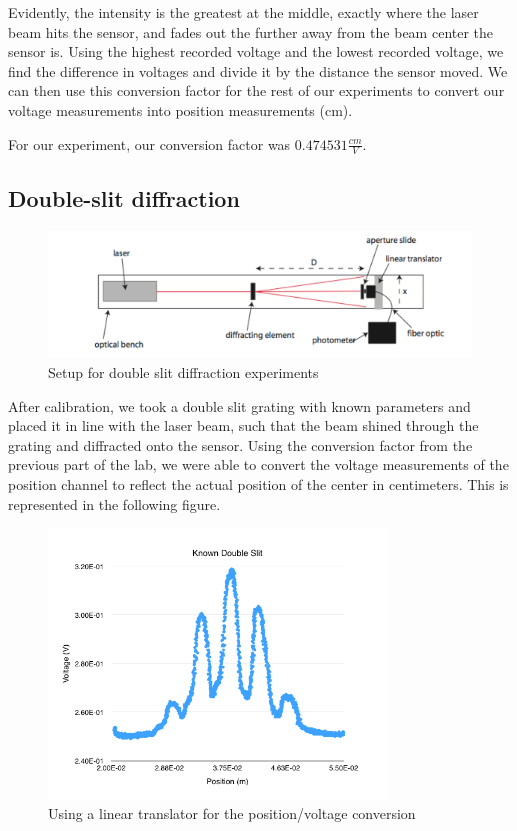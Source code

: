 \documentclass{article}
\begin{document}
Evidently, the intensity is the greatest at the middle, exactly where the laser
beam hits the sensor, and fades out the further away from the beam center the
sensor is. Using the highest recorded voltage and the lowest recorded voltage,
we find the difference in voltages and divide it by the distance the sensor
moved. We can then use this conversion factor for the rest of our experiments to
convert our voltage measurements into position measurements (cm).

For our experiment, our conversion factor was $0.474531 \frac{cm}{V}$.

\subsection{Double-slit diffraction}

\begin{figure}[H]
    \centering
    \includegraphics[width=\textwidth]{charts/double-slit}
    \caption{Setup for double slit diffraction experiments}
    \label{double-slit}
\end{figure}

After calibration, we took a double slit grating with known parameters and
placed it in line with the laser beam, such that the beam shined through the
grating and diffracted onto the sensor. Using the conversion factor from the
previous part of the lab, we were able to convert the voltage measurements of
the position channel to reflect the actual position of the center in
centimeters. This is represented in the following figure.

\begin{figure}[H]
    \centering
    \includegraphics[width=0.8\textwidth]{charts/known}
    \caption{Using a linear translator for the position/voltage conversion}
    \label{known}
\end{figure}
\end{document}
